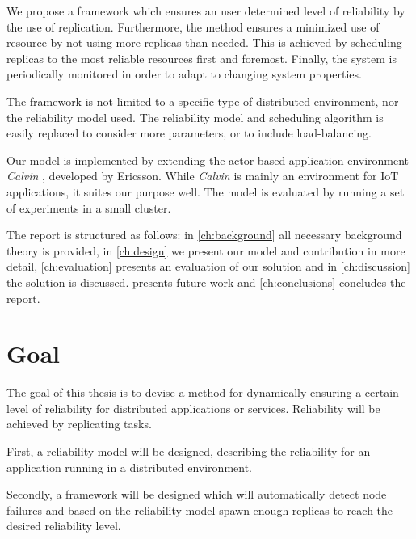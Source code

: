 \documentclass{cslthse-msc}
\begin{document}
We propose a framework which ensures an user determined level of reliability by the use of replication. Furthermore, the method ensures a minimized use of resource by not using more replicas than needed. This is achieved by scheduling replicas to the most reliable resources first and foremost. Finally, the system is periodically monitored in order to adapt to changing system properties.

The framework is not limited to a specific type of distributed environment, nor the reliability model used. The reliability model and scheduling algorithm is easily replaced to consider more parameters, or to include load-balancing.


Our model is implemented by extending the actor-based application environment \emph{Calvin} \cite{calvin}, developed by Ericsson. While \emph{Calvin} is mainly an environment for IoT applications, it suites our purpose well. The model is evaluated by running a set of experiments in a small cluster. %

The report is structured as follows: in \cref{ch:background} all necessary background theory is provided, in \cref{ch:design} we present our model and contribution in more detail, \cref{ch:evaluation} presents an evaluation of our solution and in \cref{ch:discussion} the solution is discussed.  presents future work and \cref{ch:conclusions} concludes the report. 

\section{Goal} \label{sec:introduction_goals}
The goal of this thesis is to devise a method for dynamically ensuring a certain level of reliability for distributed applications or services. Reliability will be achieved by replicating tasks.

First, a reliability model will be designed, describing the reliability for an application running in a distributed environment.

Secondly, a framework will be designed which will automatically detect node failures and based on the reliability model spawn enough replicas to reach the desired reliability level.
\end{document}
